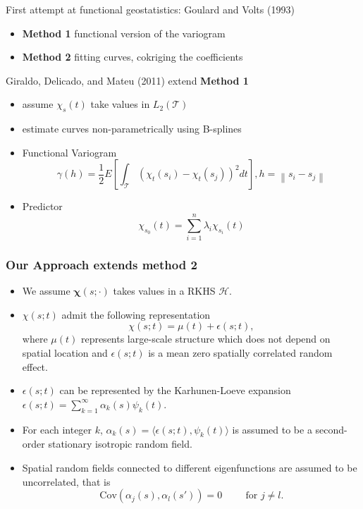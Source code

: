 \documentclass{beamer}
\newcommand{\T}{\mathcal{T}}
\renewcommand{\H}{\mathcal{H}}
\newcommand{\norm}[1]{\left\|#1\right\|}
\newcommand{\inner}[2]{\langle #1, #2 \rangle}
\begin{document}
\frame
{
First attempt at functional geostatistics: Goulard and Volts (1993)
\begin{itemize}
\item{\textbf{Method 1}} functional version of the variogram
\item{\textbf{Method 2}} fitting curves, cokriging the coefficients\\[0.2cm]
\end{itemize}
Giraldo, Delicado, and Mateu (2011) extend \textbf{Method 1}
\begin{itemize}
\item assume $\chi_s(t)$ take values in $L_2(\T)$
\item estimate curves non-parametrically using B-splines
\item Functional Variogram \[ \gamma(h) = \frac{1}{2}E\left[ \int_{\T}(\chi_t(s_i) - \chi_t(s_j))^2 dt \right] , h = \norm{s_i - s_j}\]
\item Predictor \[
\widehat{\chi_{s_0}(t)} = \sum_{i=1}^n \lambda_i \chi_{s_i}(t)
\]
\end{itemize}
}



\frame
{
\frametitle{Our Approach extends method 2}
\begin{itemize}
\item We assume $\boldsymbol\chi(s; \cdot)$  takes values in a RKHS $\H$. \\[0.2cm]
\item $\chi(s;t)$ admit the following representation 
\begin{equation}
 	\chi(s;t) = \mu(t) + \epsilon(s;t),
\end{equation}
where $\mu(t)$ represents large-scale structure which does not depend on spatial location and $\epsilon(s;t)$ is a mean zero spatially correlated random effect. 
 \item $\epsilon(s;t)$ can be represented by the Karhunen-Loeve expansion $\epsilon(s;t) = \sum_{k=1}^{\infty} \alpha_k(s)\psi_k(t)$. 
 \item For each integer $k$, $\alpha_k(s) = \inner{\epsilon(s;t)}{ \psi_k(t)}$ is assumed to be a second-order stationary isotropic random field. 
 \item Spatial random fields connected to different eigenfunctions are assumed to be uncorrelated, that is 
\begin{equation}
	\text{Cov}(\alpha_j(s), \alpha_l(s')) = 0 \hspace{1cm} \text{for } j \neq l.
	\label{eq:nocrosscor}
\end{equation} 
\end{itemize}
}
\end{document}
